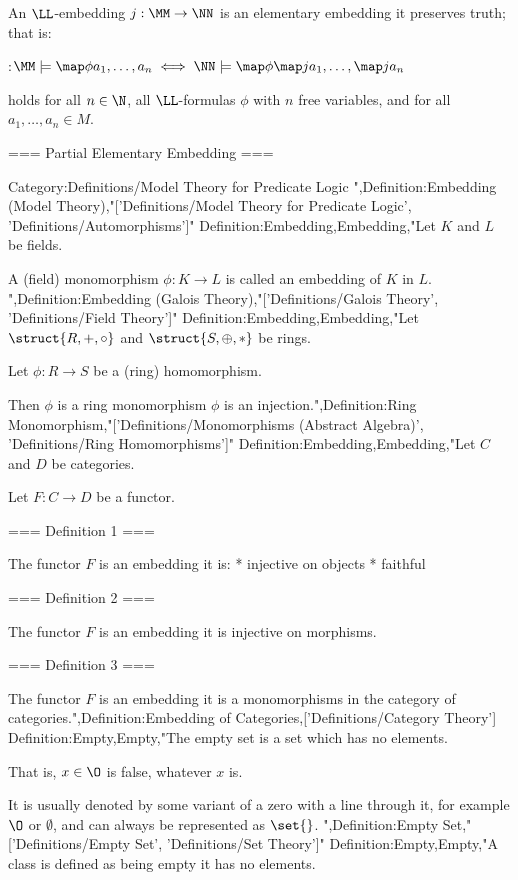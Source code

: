 An $\LL$-embedding $j:\MM \to \NN$ is an elementary embedding  it preserves truth; that is:

:$\MM \models \map \phi {a_1, \ldots, a_n} \iff \NN \models \map \phi {\map j {a_1}, \ldots, \map j {a_n} }$

holds for all $n \in \N$, all $\LL$-formulas $\phi$ with $n$ free variables, and for all $a_1, \ldots, a_n \in M$.


=== Partial Elementary Embedding ===




Category:Definitions/Model Theory for Predicate Logic
",Definition:Embedding (Model Theory),"['Definitions/Model Theory for Predicate Logic', 'Definitions/Automorphisms']"
Definition:Embedding,Embedding,"Let $K$ and $L$ be fields.

A (field) monomorphism $\phi: K \to L$ is called an embedding of $K$ in $L$.
",Definition:Embedding (Galois Theory),"['Definitions/Galois Theory', 'Definitions/Field Theory']"
Definition:Embedding,Embedding,"Let $\struct {R, +, \circ}$ and $\struct {S, \oplus, *}$ be rings.

Let $\phi: R \to S$ be a (ring) homomorphism.


Then $\phi$ is a ring monomorphism  $\phi$ is an injection.",Definition:Ring Monomorphism,"['Definitions/Monomorphisms (Abstract Algebra)', 'Definitions/Ring Homomorphisms']"
Definition:Embedding,Embedding,"Let $C$ and $D$ be categories.

Let $F : C \to D$ be a functor.


=== Definition 1 ===

The functor $F$ is an embedding  it is:
* injective on objects
* faithful


=== Definition 2 ===

The functor $F$ is an embedding  it is injective on morphisms.


=== Definition 3 ===

The functor $F$ is an embedding  it is a monomorphisms in the category of categories.",Definition:Embedding of Categories,['Definitions/Category Theory']
Definition:Empty,Empty,"The empty set is a set which has no elements.

That is, $x \in \O$ is false, whatever $x$ is.


It is usually denoted by some variant of a zero with a line through it, for example $\O$ or $\emptyset$, and can always be represented as $\set {}$.
",Definition:Empty Set,"['Definitions/Empty Set', 'Definitions/Set Theory']"
Definition:Empty,Empty,"A class is defined as being empty  it has no elements.

